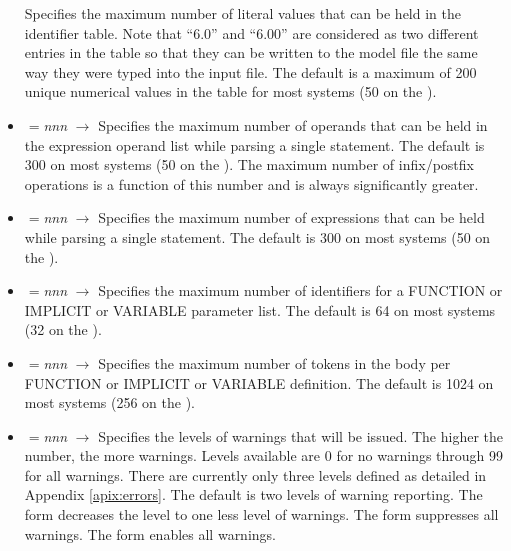 \begin{footnotesize}
\begin{itemize}
      Specifies the maximum number of literal values
      that can be held in the
      identifier table.   Note that ``6.0'' and ``6.00'' are considered
      as two different entries in the table so that they can be written
      to the model file the same way they were typed into the input file.
      The default is a maximum of 200 unique numerical values in the table
      for most systems (50 on the ).
\item {}$=${\em nnn} $\longrightarrow$
      Specifies the maximum number of operands
      that can be held in the
      expression operand list while parsing a single statement.
      The default is 300 on most systems (50 on the ).  The
      maximum number of infix/postfix operations
      is a function of this number and is always significantly greater.
\item {}$=${\em nnn} $\longrightarrow$
      Specifies the maximum number of expressions
      that can be held while parsing a single statement.
      The default is 300 on most systems (50 on the ).
\item {}$=${\em nnn} $\longrightarrow$
      Specifies the maximum number of identifiers for
      a FUNCTION or IMPLICIT or VARIABLE parameter list.
      The default is 64 on most systems (32 on the ).
\item {}$=${\em nnn} $\longrightarrow$
      Specifies the maximum number of tokens in the body per FUNCTION or
      IMPLICIT or VARIABLE definition.
      The default is 1024 on most systems (256 on the ).
\item {}$=${\em nnn} $\longrightarrow$
      Specifies the levels of warnings that will be issued.   The higher
      the number, the more warnings.   Levels available are 0 for no warnings
      through 99 for all warnings.   There are currently only three levels
      defined as detailed in Appendix \ref{apix:errors}.
      The default is two levels of warning reporting.
      The  form decreases the level to one less level of
      warnings.
      The  form suppresses all warnings.
      The  form enables all warnings.
\end{itemize}\end{footnotesize}

